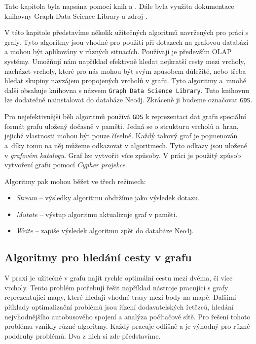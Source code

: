 \documentclass[
  program=infoi,
  biblatex=true,
  figures=true,
  glossaries=false,
  index,
  sourcecodes=true
]{kidiplom}
\begin{document}
Tato kapitola byla napsána pomocí knih \cite{graphAlgorithms} a \cite{inAction}. Dále byla využita dokumentace knihovny Graph Data Science Library \cite{neo4jDoc} a zdroj \cite{disk}.

V této kapitole představíme několik užitečných algoritmů navržených pro práci s grafy. Tyto algoritmy jsou vhodné pro použití při dotazech na grafovou databázi a mohou být aplikovány v různých situacích. Používají je především OLAP systémy. Umožňují nám například efektivně hledat nejkratší cesty mezi vrcholy, nacházet vrcholy, které pro nás mohou být svým způsobem důležité, nebo třeba hledat skupiny navzájem propojených vrcholů v grafu. Tyto algoritmy a~mnohé další obsahuje knihovna s názvem \texttt{Graph Data Science Library}. Tuto knihovnu lze dodatečně nainstalovat do databáze Neo4j. Zkráceně ji budeme označovat \texttt{GDS}.

Pro nejefektivnější běh algoritmů používá \texttt{GDS} k reprezentaci dat grafu speciální formát grafu uložený dočasně v paměti. Jedná se o strukturu vrcholů a~hran, jejichž vlastnosti mohou být pouze číselné. Každý takový graf je pojmenován a~díky tomu na něj můžeme odkazovat v algoritmech. Tyto odkazy jsou uložené v \textit{grafovém katalogu}. Graf lze vytvořit více způsoby. V práci je použitý způsob vytvoření grafu pomocí \textit{Cypher projekce}.

Algoritmy pak mohou běžet ve třech režimech:
\begin{itemize}
\item \textit{Stream} -- výsledky algoritmu obdržíme jako výsledek dotazu.
\item \textit{Mutate} -- výstup algoritmu aktualizuje graf v paměti.
\item \textit{Write} -- zapíše výsledek algoritmu zpět do databáze Neo4j.
\end{itemize}

\subsection{Algoritmy pro hledání cesty v grafu}
V praxi je užitečné v grafu najít rychle optimální cestu mezi dvěma, či více vrcholy. Tento problém potřebují řešit například nástroje pracující s grafy reprezentující mapy, které hledají vhodné trasy mezi body na mapě. Dalšími příklady optimalizační problémů jsou řízení dodavatelských řetězců, hledání nejvhodnějšího autobusového spojení a analýza počítačové sítě. Pro řešení tohoto problému vznikly různé algoritmy. Každý pracuje odlišně a je výhodný pro různé poddruhy problémů. Dva z nich si zde představíme.
\end{document}
